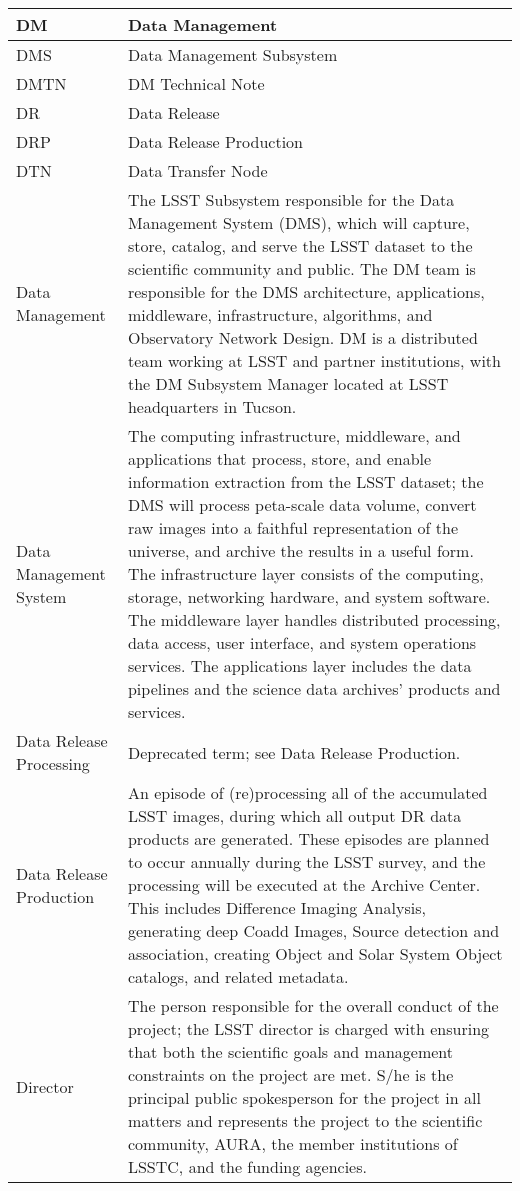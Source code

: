 \begin{longtable}{|l|p{}|}
DM & \gls{Data Management} \\\hline
DMS & Data Management Subsystem \\\hline
DMTN & DM Technical Note \\\hline
DR & Data Release \\\hline
DRP & Data Release Production \\\hline
DTN & Data Transfer Node \\\hline
Data Management & The LSST Subsystem responsible for the Data Management System (DMS), which will capture, store, catalog, and serve the LSST dataset to the scientific community and public. The DM team is responsible for the DMS architecture, applications, middleware, infrastructure, algorithms, and Observatory Network Design. DM is a distributed team working at LSST and partner institutions, with the DM Subsystem Manager located at LSST headquarters in Tucson. \\\hline
Data Management System & The computing infrastructure, middleware, and applications that process, store, and enable information extraction from the LSST dataset; the DMS will process peta-scale data volume, convert raw images into a faithful representation of the universe, and archive the results in a useful form. The infrastructure layer consists of the computing, storage, networking hardware, and system software. The middleware layer handles distributed processing, data access, user interface, and system operations services. The applications layer includes the data pipelines and the science data archives' products and services. \\\hline
Data Release Processing & Deprecated term; see Data Release Production. \\\hline
Data Release Production & An episode of (re)processing all of the accumulated LSST images, during which all output DR data products are generated. These episodes are planned to occur annually during the LSST survey, and the processing will be executed at the Archive Center. This includes Difference Imaging Analysis, generating deep Coadd Images, Source detection and association, creating Object and Solar System Object catalogs, and related metadata. \\\hline
Director & The person responsible for the overall conduct of the project; the LSST director is charged with ensuring that both the scientific goals and management constraints on the project are met. S/he is the principal public spokesperson for the project in all matters and represents the project to the scientific community, AURA, the member institutions of LSSTC, and the funding agencies. \\\hline

\end{longtable}
